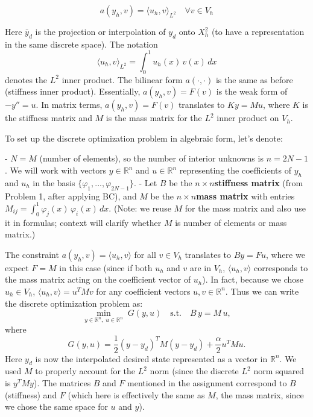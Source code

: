 \[
	a(y_h, v) = {\langle u_h, v \rangle}_{L^2}\quad \forall v \in V_h
\]


Here \(\bar{y}_d\) is the projection or interpolation of \(y_d\) onto \(X_h^2\) (to have a representation in the same discrete space).
The notation
\[
	{\langle u_h, v \rangle}_{L^2} = \int_0^1 u_h(x)\,v(x)\,dx
\]
denotes the \(L^2\) inner product. The bilinear form \(a(\cdot,\cdot)\) is the same as before (stiffness inner product).
Essentially, \(a(y_h,v) = F(v)\) is the weak form of \(-y''=u\). In matrix terms, \(a(y_h,v)=F(v)\) translates to \(K y = M u\), where \(K\) is the stiffness matrix and \(M\) is the mass matrix for the \(L^2\) inner product on \(V_h\).

To set up the discrete optimization problem in algebraic form, let's denote:

- \(N = M\) (number of elements), so the number of interior unknowns is \(n = 2N-1\). We will work with vectors \(y \in \mathbb{R}^n\) and \(u \in \mathbb{R}^n\) representing the coefficients of \(y_h\) and \(u_h\) in the basis \(\{\varphi_1,...,\varphi_{2N-1}\}\).
- Let \(B\) be the \(n \times n\)\textbf{stiffness matrix} (from Problem 1, after applying BC), and \(M\) be the \(n \times n\)\textbf{mass matrix} with entries \(M_{ij} = \int_0^1 \varphi_j(x)\,\varphi_i(x)\,dx\). (Note: we reuse \(M\) for the mass matrix and also use it in formulas; context will clarify whether \(M\) is number of elements or mass matrix.)

The constraint \(a(y_h,v) = \langle u_h,v\rangle\) for all \(v\in V_h\) translates to \(B y = F u\), where we expect \(F = M\) in this case (since if both \(u_h\) and \(v\) are in \(V_h\), \(\langle u_h, v\rangle\) corresponds to the mass matrix acting on the coefficient vector of \(u_h\)).
In fact, because we chose \(u_h \in V_h\), \(\langle u_h, v\rangle = u^T M v\) for any coefficient vectors \(u,v \in \mathbb{R}^n\).
Thus we can write the discrete optimization problem as:
\[\min_{y \in \mathbb{R}^n,\;u \in \mathbb{R}^n} \; G(y,u) \quad \text{s.t.}\quad B\,y = M\,u,\]
where
\[G(y,u) = \frac{1}{2}(y - y_d)^T M (y - y_d) + \frac{\alpha}{2} u^T M u.\]
Here \(y_d\) is now the interpolated desired state represented as a vector in \(\mathbb{R}^n\). We used \(M\) to properly account for the \(L^2\) norm (since the discrete \(L^2\) norm squared is \(y^T M y\)). The matrices \(B\) and \(F\) mentioned in the assignment correspond to \(B\) (stiffness) and \(F\) (which here is effectively the same as \(M\), the mass matrix, since we chose the same space for \(u\) and \(y\)).

